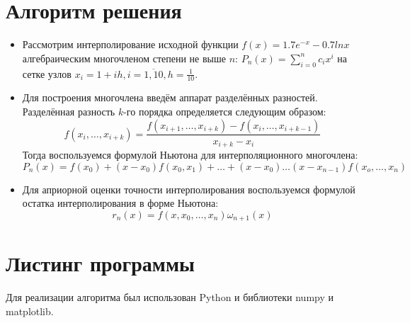 \documentclass[14pt, a4paper]{article}
\begin{document}
  \section{Алгоритм решения}
  \begin{itemize}
     \item
     Рассмотрим интерполирование исходной функции $f(x) = 1.7e^{-x} - 0.7lnx$ алгебраическим многочленом степени не выше $n$: $P_n(x) = \sum\limits_{i = 0}^n c_ix^i$ на сетке узлов $x_i = 1 + ih, i = \overline{1, 10}, h = \frac{1}{10}$.
     \item
     Для построения многочлена введём аппарат разделённых разностей. Разделённая разность $k$-го порядка определяется следующим образом: $$f(x_i, \dots, x_{i+k}) = \frac{f(x_{i+1}, \dots, x_{i+k}) - f(x_i, \dots, x_{i+k-1})}{x_{i+k}-x_i}$$
     Тогда воспользуемся формулой Ньютона для интерполяционного многочлена: \begin{equation}P_n(x) = f(x_0) + (x - x_0)f(x_0, x_1) + \dots + (x-x_0)\dots(x-x_{n-1})f(x_o, \dots, x_n)\end{equation}
     \item
     Для априорной оценки точности интерполирования воспользуемся формулой остатка интерполирования в форме Ньютона:
     \begin{equation}r_n(x) = f(x, x_0, \dots, x_n)\omega_{n+1}(x)\end{equation}
  \end{itemize}
  \section{Листинг программы}
  Для реализации алгоритма был использован Python и библиотеки numpy и matplotlib.
\end{document}
